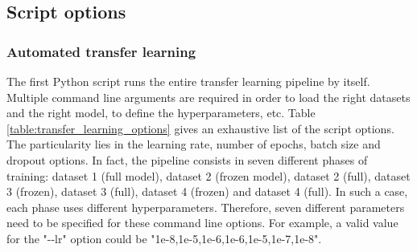 \subsection{Script options}
\label{sec:tl_script_options}

\subsubsection{Automated transfer learning}
\setlength{\marginparwidth}{3cm}\leavevmode {}The first Python script runs the entire transfer learning pipeline by itself. Multiple command line arguments are required in order to load the right datasets and the right model, to define the hyperparameters, etc. Table \ref{table:transfer_learning_options} gives an exhaustive list of the script options. The particularity lies in the learning rate, number of epochs, batch size and dropout options. In fact, the pipeline consists in seven different phases of training: dataset 1 (full model), dataset 2 (frozen model), dataset 2 (full), dataset 3 (frozen), dataset 3 (full), dataset 4 (frozen) and dataset 4 (full). In such a case, each phase uses different hyperparameters. Therefore, seven different parameters need to be specified for these command line options. For example, a valid value for the "-{}-lr" option could be "1e-8,1e-5,1e-6,1e-6,1e-5,1e-7,1e-8".

